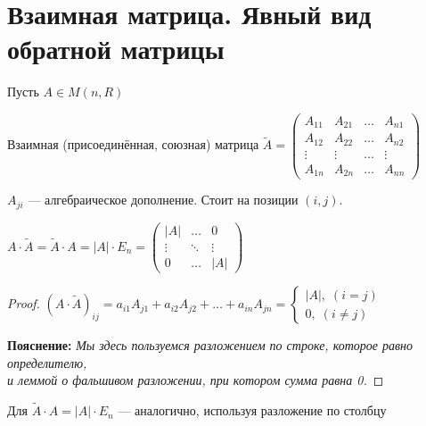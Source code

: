 
\section{Взаимная матрица. Явный вид обратной матрицы}

\begin{conj}
    
    Пусть $A \in M(n, R)$

    Взаимная (присоединённая, союзная) матрица $\widetilde{A} =
        \begin{pmatrix}
            A_{11} & A_{21} & \dots & A_{n1} \\
            A_{12} & A_{22} & \dots & A_{n2} \\
            \vdots & \vdots & \dots & \vdots \\
            A_{1n} & A_{2n} & \dots & A_{nn}
        \end{pmatrix}
    $
    
    $A_{ji}$ --- алгебраическое дополнение. Стоит на позиции $(i, j)$.
\end{conj}

\begin{theorem-non}
    
    $A \cdot \widetilde{A} = \widetilde{A} \cdot A = |A| \cdot E_n =
        \begin{pmatrix}
            |A| & \dots & 0 \\
            \vdots & \ddots & \vdots \\
            0 & \dots & |A|
        \end{pmatrix}
    $


    \begin{proof}
        $(A \cdot \widetilde{A})_{ij} = a_{i1}A_{j1} + a_{i2}A_{j2} + \dots + a_{in}A_{jn} =
            \begin{cases}
                |A|, \; (i = j) \\
                0, \; (i \neq j)
            \end{cases}
        $

        \textbf{Пояснение:}
        \emph{Мы здесь пользуемся разложением по строке,
        которое равно определителю,}\\
        \emph{и леммой о фальшивом разложении, при котором сумма равна 0.}
    \end{proof}

    \notice Для $\widetilde{A} \cdot A = |A| \cdot E_n$ --- аналогично,
    используя разложение по столбцу

\end{theorem-non}


